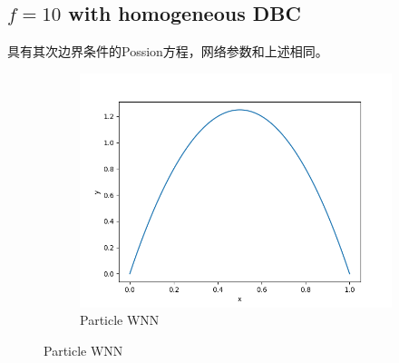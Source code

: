 \subsection*{$f=10$ with homogeneous DBC}
具有其次边界条件的Possion方程，网络参数和上述相同。
\begin{figure}[H]
    \centering  
    \begin{subfigure}{0.5\textwidth}  
        \centering  
        \includegraphics[width=0.9\linewidth]{./pics/final/possion/dgnet1d/pwnn2.png}  
        \caption{Particle WNN}
    \end{subfigure}  


\end{figure}
